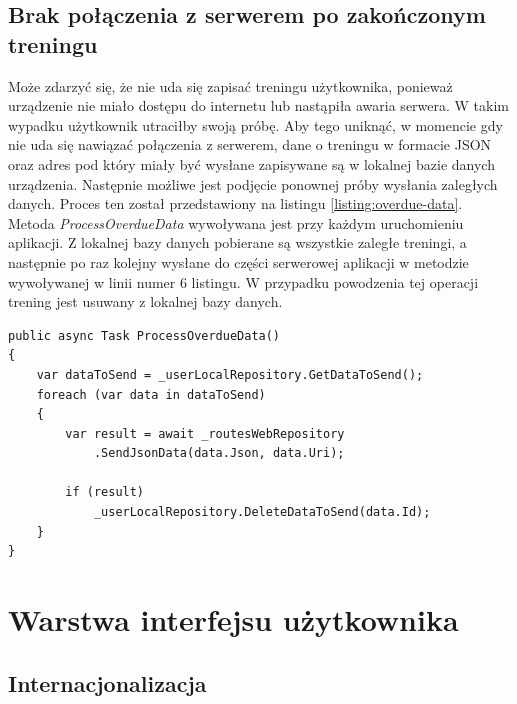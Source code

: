 \subsection{Brak połączenia z serwerem po zakończonym treningu}
Może zdarzyć się, że nie uda się zapisać treningu użytkownika, ponieważ urządzenie nie miało dostępu do internetu lub nastąpiła awaria serwera. W takim wypadku użytkownik utraciłby swoją próbę. Aby tego uniknąć, w momencie gdy nie uda się nawiązać połączenia z serwerem, dane o treningu w formacie JSON oraz adres pod który miały być wysłane zapisywane są w lokalnej bazie danych urządzenia. Następnie możliwe jest podjęcie ponownej próby wysłania zaległych danych. Proces ten został przedstawiony na listingu \ref{listing:overdue-data}. Metoda \textit{ProcessOverdueData} wywoływana jest przy każdym uruchomieniu aplikacji. Z lokalnej bazy danych pobierane są wszystkie zaległe treningi, a następnie po raz kolejny wysłane do części serwerowej aplikacji w metodzie wywoływanej w linii numer 6 listingu. W przypadku powodzenia tej operacji trening jest usuwany z lokalnej bazy danych.
\begin{lstlisting}[caption={Wyznaczenie poziomu terenu},label=listing:overdue-data]
public async Task ProcessOverdueData()
{
    var dataToSend = _userLocalRepository.GetDataToSend();
    foreach (var data in dataToSend)
    {
        var result = await _routesWebRepository
        	.SendJsonData(data.Json, data.Uri);

        if (result)
            _userLocalRepository.DeleteDataToSend(data.Id);
    }
}
\end{lstlisting}

\section{Warstwa interfejsu użytkownika}
\subsection{Internacjonalizacja}